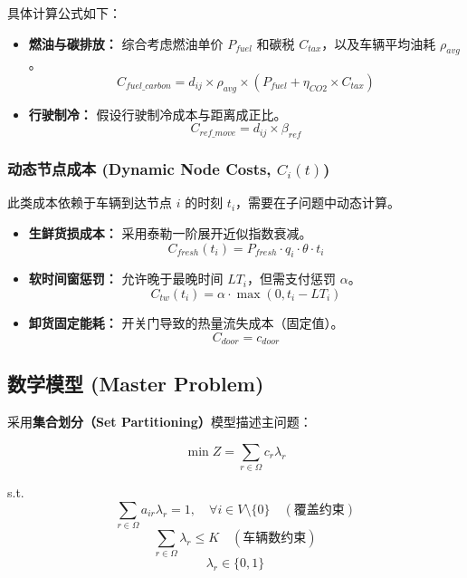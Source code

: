 \documentclass[11pt, a4paper]{article}
\begin{document}
具体计算公式如下：
\begin{itemize}
    \item \textbf{燃油与碳排放：} 综合考虑燃油单价 $P_{fuel}$ 和碳税 $C_{tax}$，以及车辆平均油耗 $\rho_{avg}$。
    \begin{equation}
    C_{fuel\_carbon} = d_{ij} \times \rho_{avg} \times (P_{fuel} + \eta_{CO2} \times C_{tax})
    \end{equation}
    \item \textbf{行驶制冷：} 假设行驶制冷成本与距离成正比。
    \begin{equation}
    C_{ref\_move} = d_{ij} \times \beta_{ref}
    \end{equation}
\end{itemize}

\subsubsection{动态节点成本 (Dynamic Node Costs, $C_i(t)$)}
此类成本依赖于车辆到达节点 $i$ 的时刻 $t_i$，需要在子问题中动态计算。
\begin{itemize}
    \item \textbf{生鲜货损成本：} 采用泰勒一阶展开近似指数衰减。
    \begin{equation}
    C_{fresh}(t_i) = P_{fresh} \cdot q_i \cdot \theta \cdot t_i
    \end{equation}
    \item \textbf{软时间窗惩罚：} 允许晚于最晚时间 $LT_i$，但需支付惩罚 $\alpha$。
    \begin{equation}
    C_{tw}(t_i) = \alpha \cdot \max(0, t_i - LT_i)
    \end{equation}
    \item \textbf{卸货固定能耗：} 开关门导致的热量流失成本（固定值）。
    \begin{equation}
    C_{door} = c_{door}
    \end{equation}
\end{itemize}

\subsection{数学模型 (Master Problem)}
采用\textbf{集合划分（Set Partitioning）}模型描述主问题：

\begin{equation}
\min Z = \sum_{r \in \Omega} c_r \lambda_r
\end{equation}

s.t.
\begin{equation}
\sum_{r \in \Omega} a_{ir} \lambda_r = 1, \quad \forall i \in V \setminus \{0\} \quad (\text{覆盖约束})
\end{equation}
\begin{equation}
\sum_{r \in \Omega} \lambda_r \le K \quad (\text{车辆数约束})
\end{equation}
\begin{equation}
\lambda_r \in \{0, 1\}
\end{equation}
\end{document}
